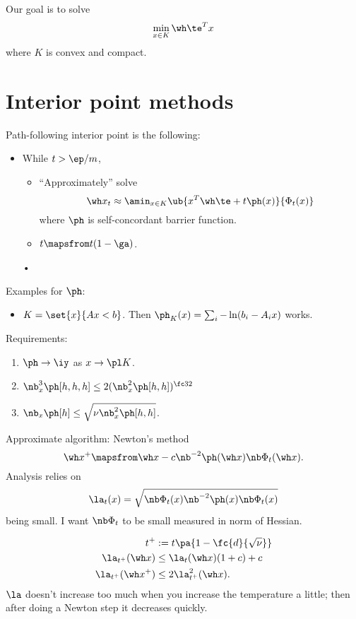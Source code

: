 \def\filepath{C:/Users/oldhe/Dropbox/Math/templates}






\pagestyle{fancy}
\chead{} 
\rhead{} 
\lfoot{} 
\cfoot{\thepage} 
\rfoot{} 
\renewcommand{\headrulewidth}{.3pt} 
\setlength\voffset{0in}
\setlength\textheight{648pt}





Our goal is to solve
$$
\min_{x\in K} \wh \te^T x
$$
where $K$ is convex and compact.

\section{Interior point methods}

Path-following interior point is the following:
\begin{itemize}
\item
While $t>\ep/m$,
\begin{itemize}
\item
``Approximately'' solve 
$$\wh x_t \approx \amin_{x\in K} \ub{x^T\wh \te + t\ph(x)}{\Phi_t(x)}$$
 where $\ph$ is self-concordant barrier function.
\item
$t\mapsfrom t(1-\ga)$.
\end{itemize}•
\end{itemize}
Examples for $\ph$:
\begin{itemize}
\item
$K=\set{x}{Ax<b}$. Then $\ph_K(x) = \sum_i -\ln (b_i - A_ix)$ works.
\end{itemize}
Requirements:
\begin{enumerate}
\item
$\ph\to \iy$ as $x\to \pl K$.
\item
$\nb_x^3 \ph[h,h,h] \le 2(\nb_x^2 \ph[h,h])^{\fc 32}$
\item
$\nb_x \ph[h]\le \sqrt{\nu\nb_x^2\ph[h,h]}$.
\end{enumerate}

Approximate algorithm: Newton's method
$$
\wh x^+\mapsfrom \wh x - c \nb^{-2} \ph(\wh x) \nb \Phi_t(\wh x).
$$
Analysis relies on 
$$
\la_t(x) = \sqrt{\nb \Phi_t(x) \nb^{-2}\ph(x) \nb \Phi_t(x)}
$$
being small. I want $\nb \Phi_t$ to be small measured in norm of Hessian. 

\begin{align}
t^+ &:= t\pa{1-\fc{d}{\sqrt \nu}}\\
\la_{t^+}(\wh x) &\le \la_t(\wh x)(1+c)+c\\
\la_{t^+}(\wh x^+) &\le 2\la_{t^+}^2(\wh x).
\end{align}
%
$\la$ doesn't increase too much when you increase the temperature a little; then after doing a Newton step it decreases quickly.


